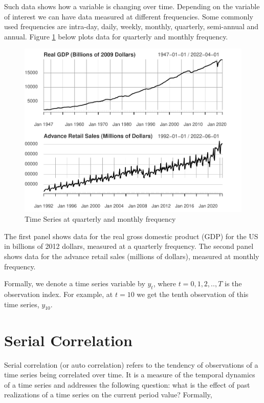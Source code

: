 \documentclass[]{book}
\theoremstyle{definition}
\theoremstyle{definition}
\theoremstyle{definition}
\theoremstyle{remark}
\begin{document}
Such data shows how a variable is changing over time. Depending on the variable of interest we can have data measured at different frequencies. Some commonly used frequencies are intra-day, daily, weekly, monthly, quarterly, semi-annual and annual. Figure \ref{fig:ch1-figure1} below plots data for quarterly and monthly frequency.

\begin{figure}

{\centering \includegraphics[width=0.8\linewidth]{bookdown-demo_files/figure-latex/ch1-figure1-1} 

}

\caption{Time Series at quarterly and monthly frequency}\label{fig:ch1-figure1}
\end{figure}

The first panel shows data for the real gross domestic product (GDP) for the US in billions of 2012 dollars, measured at a quarterly frequency. The second panel shows data for the advance retail sales (millions of dollars), measured at monthly frequency.

Formally, we denote a time series variable by \(y_t\), where \(t=0,1,2,..,T\) is the observation index. For example, at \(t=10\) we get the tenth observation of this time series, \(y_{10}\).

\hypertarget{serial-correlation}{%
\section{Serial Correlation}\label{serial-correlation}}

Serial correlation (or auto correlation) refers to the tendency of observations of a time series being correlated over time. It is a measure of the temporal dynamics of a time series and addresses the following question: what is the effect of past realizations of a time series on the current period value? Formally,
\end{document}
